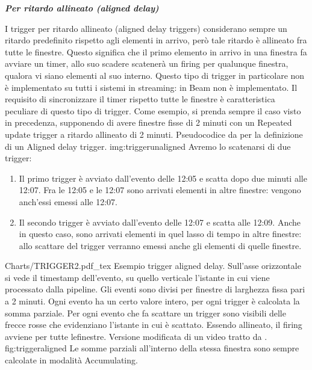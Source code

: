 \textbf{\textit{
		Per ritardo allineato (aligned delay)
	}}

I trigger per ritardo allineato (aligned delay triggers) considerano sempre un ritardo predefinito rispetto agli elementi in arrivo, però tale ritardo è allineato fra tutte le finestre. Questo significa che il primo elemento in arrivo in una finestra fa avviare un timer, allo suo scadere scatenerà un firing per qualunque finestra, qualora vi siano elementi al suo interno. Questo tipo di trigger in particolare non è implementato su tutti i sistemi in streaming: in Beam non è implementato. Il requisito di sincronizzare il timer rispetto tutte le finestre è caratteristica peculiare di questo tipo di trigger.
Come esempio, si prenda sempre il caso visto in precedenza, supponendo di avere finestre fisse di 2 minuti con un Repeated update trigger a ritardo allineato di 2 minuti.
{Pseudocodice da \cite{akidauchernyaklax} per la definizione di un Aligned delay trigger.}
{img:triggerunaligned}
Avremo lo scatenarsi di due trigger:
\begin{enumerate}
\item Il primo trigger è avviato dall’evento delle 12:05 e scatta dopo due minuti alle 12:07. Fra le 12:05 e le 12:07 sono arrivati elementi in altre finestre: vengono anch’essi emessi alle 12:07.
\item Il secondo trigger è avviato dall’evento delle 12:07 e scatta alle 12:09.  Anche in questo caso, sono arrivati elementi in quel lasso di tempo in altre finestre: allo scattare del trigger verranno emessi anche gli elementi di quelle finestre.
\end{enumerate}
\svg
{Charts/TRIGGER2.pdf_tex}
{Esempio trigger aligned delay. Sull'asse orizzontale si vede il timestamp dell'evento, su quello verticale l'istante in cui viene processato dalla pipeline. Gli eventi sono divisi per finestre di larghezza fissa pari a 2 minuti. Ogni evento ha un certo valore intero, per ogni trigger è calcolata la somma parziale. Per ogni evento che fa scattare un trigger sono visibili delle frecce rosse che evidenziano l'istante in cui è scattato. Essendo allineato, il firing avviene per tutte lefinestre. Versione modificata di un video tratto da  \cite{akidau_chernyak_lax_2018}. }
{fig:triggeraligned}
Le somme parziali all'interno della stessa finestra sono sempre calcolate in modalità Accumulating.

